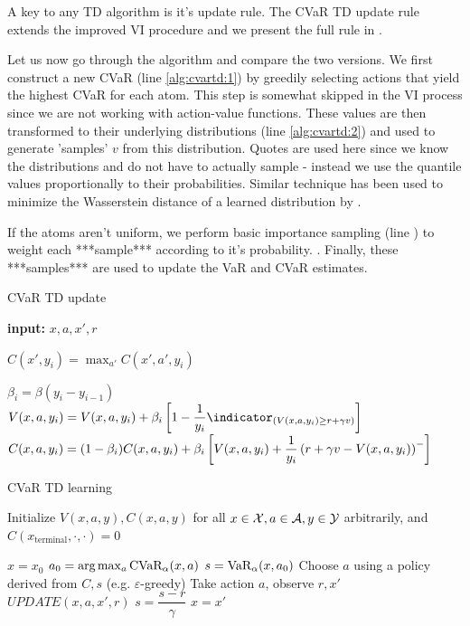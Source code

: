 A key to any TD algorithm is it's update rule. The CVaR TD update rule extends the improved VI procedure and we present the full rule in . 

Let us now go through the algorithm and compare the two versions. We first construct a new CVaR (line \ref{alg:cvartd:1}) by greedily selecting actions that yield the highest CVaR for each atom. This step is somewhat skipped in the VI process since we are not working with action-value functions. These values are then transformed to their underlying distributions (line \ref{alg:cvartd:2}) and used to generate 'samples' $v$ from this distribution. Quotes are used here since we know the distributions and do not have to actually sample - instead we use the quantile values proportionally to their probabilities. Similar technique has been used to minimize the Wasserstein distance of a learned distribution by \citet{dabney2017distributional}.

If the atoms aren't uniform, we perform basic importance sampling (line \label{alg:cvartd:3}) to weight each ***sample*** according to it's probability. . Finally, these ***samples*** are used to update the VaR and CVaR estimates.


\begin{algorithm}
\caption{CVaR TD update}
\begin{algorithmic}[1]\label{alg:cvartd}

    \STATE \textbf{input:} $x, a, x', r$
    
	\STATE $C(x', y_i) = \max_{a'} C(x', a', y_i)$ \label{alg:cvartd:1}
	\ENDFOR
	
	\STATE {} \label{alg:cvartd:2}

	\STATE $\beta_i = \beta (y_i-y_{i-1})$  \label{alg:cvartd:3}
	\STATE $V(x, a, y_i) = V(x, a, y_i) + \beta_i \bsquare{1 - \dfrac{1}{y_i}\indicator_{(V(x, a, y_i) \ge r+\gamma v)}}$  \label{alg:cvartd:4}
	\STATE $C(x, a, y_i) = (1-\beta_i)C(x, a, y_i) + \beta_i \left[ {V(x, a, y_i) + \dfrac{1}{y_i}\left( {r+\gamma v - V(x, a, y_i)} \right)^-} \right]$  \label{alg:cvartd:5}
	\ENDFOR
	
\end{algorithmic}
\end{algorithm}

\begin{algorithm}
\caption{CVaR TD learning}
\begin{algorithmic}
    \STATE Initialize $V(x, a, y), C(x, a, y)$ for all $x\in\mathcal{X}, a\in\mathcal{A}, y\in\mathcal{Y}$ arbitrarily, and $C(x_\text{terminal}, \cdot, \cdot) = 0$
    
		
	\STATE $x = x_0$
	\STATE $a_0 = \text{arg}\max_a \text{CVaR}_\alpha(x, a)$
	\STATE $s = \text{VaR}_\alpha(x, a_0)$
	\STATE Choose $a$ using a policy derived from $C, s$ (e.g. $\varepsilon$-greedy)
	\STATE Take action $a$, observe $r, x'$
	\STATE $UPDATE(x, a, x', r)$
	\STATE $s = \dfrac{s-r}{\gamma}$
	\STATE $x = x'$
	\ENDWHILE
	
	\ENDFOR
\end{algorithmic}
\end{algorithm}

